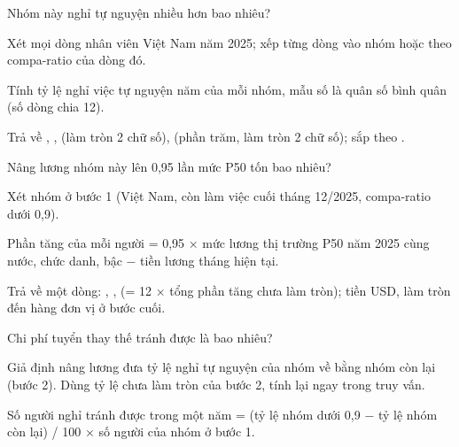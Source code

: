 \documentclass[11pt,a4paper]{article}
\begin{document}
\begin{cauhoi}
\begin{buoc}[ma=b2, diem=10, hinhthuc=write, bang={employee_monthly_snapshot}]{Nhóm này nghỉ tự nguyện nhiều hơn bao nhiêu?}
  \begin{yeucau}
    \item Xét mọi dòng nhân viên Việt Nam năm 2025; xếp từng dòng vào nhóm  hoặc  theo compa-ratio của dòng đó.
    \item Tính tỷ lệ nghỉ việc tự nguyện năm của mỗi nhóm, mẫu số là quân số bình quân (số dòng chia 12).
    \item Trả về , ,  (làm tròn 2 chữ số),  (phần trăm, làm tròn 2 chữ số); sắp theo .
  \end{yeucau}
\end{buoc}
\begin{buoc}[ma=b3, diem=10, hinhthuc=write, bang={employee_monthly_snapshot, country_market_benchmark}]{Nâng lương nhóm này lên 0,95 lần mức P50 tốn bao nhiêu?}
  \begin{yeucau}
    \item Xét nhóm ở bước 1 (Việt Nam, còn làm việc cuối tháng 12/2025, compa-ratio dưới 0,9).
    \item Phần tăng của mỗi người = 0,95 × mức lương thị trường P50 năm 2025 cùng nước, chức danh, bậc − tiền lương tháng hiện tại.
    \item Trả về một dòng: , ,  (= 12 × tổng phần tăng chưa làm tròn); tiền USD, làm tròn đến hàng đơn vị ở bước cuối.
  \end{yeucau}
\end{buoc}
\begin{buoc}[ma=b4, diem=10, hinhthuc=write, bang={employee_monthly_snapshot, recruiting_pipeline}]{Chi phí tuyển thay thế tránh được là bao nhiêu?}
  \begin{yeucau}
    \item Giả định nâng lương đưa tỷ lệ nghỉ tự nguyện của nhóm về bằng nhóm còn lại (bước 2). Dùng tỷ lệ chưa làm tròn của bước 2, tính lại ngay trong truy vấn.
    \item Số người nghỉ tránh được trong một năm = (tỷ lệ nhóm dưới 0,9 − tỷ lệ nhóm còn lại) / 100 × số người của nhóm ở bước 1.

\end{yeucau}
\end{buoc}
\end{cauhoi}
\end{document}
